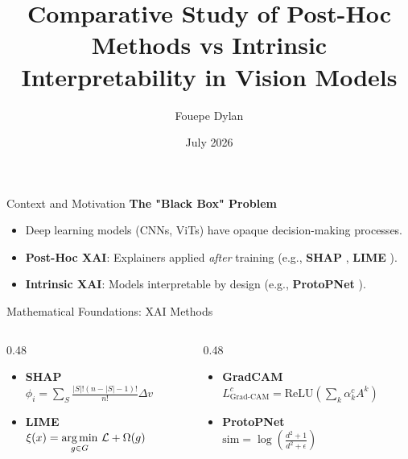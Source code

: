 \documentclass[aspectratio=169]{beamer}
\title[XAI Comparative Study]{Comparative Study of Post-Hoc Methods vs Intrinsic Interpretability in Vision Models}
\author{Fouepe Dylan}
\institute[Unifi]{University of Florence}
\date{July 2026}
\begin{document}
\begin{frame}
    \titlepage
\end{frame}

\begin{frame}{Context and Motivation}
    \textbf{The "Black Box" Problem}
    \vspace{0.2cm}
    \begin{itemize}
        \item Deep learning models (CNNs, ViTs) have opaque decision-making processes.
        \item \textbf{Post-Hoc XAI}: Explainers applied \textit{after} training (e.g., \textbf{SHAP} \cite{lundberg2017unified}, \textbf{LIME} \cite{ribeiro2016should}).
        \item \textbf{Intrinsic XAI}: Models interpretable by design (e.g., \textbf{ProtoPNet} \cite{chen2019this}).
    \end{itemize}
\end{frame}

\begin{frame}{Mathematical Foundations: XAI Methods}
    \begin{columns}
        \begin{column}{0.48\textwidth}
            \begin{itemize}
                \item \textbf{SHAP} \\
                {\small $\phi_i = \sum_{S} \frac{|S|! (n - |S| - 1)!}{n!} \Delta v$}
                \item \textbf{LIME} \\
                {\small $\xi(x) = \underset{g \in G}{\text{arg\,min}} \,\, \mathcal{L} + \Omega(g)$}
            \end{itemize}
        \end{column}
        \begin{column}{0.48\textwidth}
            \begin{itemize}
                \item \textbf{GradCAM} \\
                {\small $L_{\text{Grad-CAM}}^c = \text{ReLU} \left( \sum_k \alpha_k^c A^k \right)$}
                \item \textbf{ProtoPNet} \\
                {\small $\text{sim} = \log\left(\frac{d^2 + 1}{d^2 + \epsilon}\right)$}
            \end{itemize}
        \end{column}
    \end{columns}
\end{frame}
\end{document}
